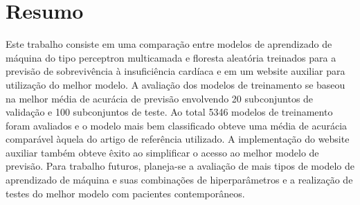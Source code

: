 \chapter*{Resumo}

Este trabalho consiste em uma comparação entre modelos de aprendizado de máquina do tipo perceptron multicamada e floresta aleatória treinados para a previsão de sobrevivência à insuficiência cardíaca e em um website auxiliar para utilização do melhor modelo. A avaliação dos modelos de treinamento se baseou na melhor média de acurácia de previsão envolvendo 20 subconjuntos de validação e 100 subconjuntos de teste. Ao total 5346 modelos de treinamento foram avaliados e o modelo mais bem classificado obteve uma média de acurácia comparável àquela do artigo de referência utilizado. A implementação do website auxiliar também obteve êxito ao simplificar o acesso ao melhor modelo de previsão. Para trabalho futuros, planeja-se a avaliação de mais tipos de modelo de aprendizado de máquina e suas combinações de hiperparâmetros e a realização de testes do melhor modelo com pacientes contemporâneos.

